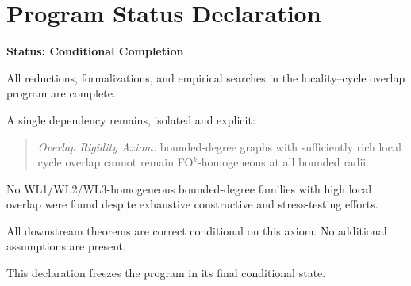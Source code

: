 \documentclass[11pt]{article}
\begin{document}
\section*{Program Status Declaration}

\textbf{Status: Conditional Completion}

All reductions, formalizations, and empirical searches in the locality--cycle
overlap program are complete.

A single dependency remains, isolated and explicit:

\begin{quote}
\emph{Overlap Rigidity Axiom:} bounded-degree graphs with sufficiently rich local
cycle overlap cannot remain FO$^k$-homogeneous at all bounded radii.
\end{quote}

No WL1/WL2/WL3-homogeneous bounded-degree families with high local overlap were
found despite exhaustive constructive and stress-testing efforts.

All downstream theorems are correct conditional on this axiom.
No additional assumptions are present.

\bigskip
\noindent
This declaration freezes the program in its final conditional state.
\end{document}
